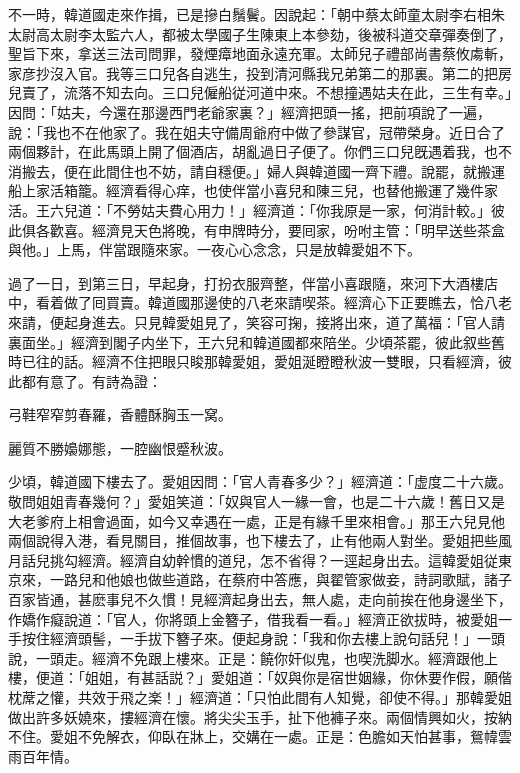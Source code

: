 不一時，韓道國走來作揖，已是摻白鬚鬢。因說起：「朝中蔡太師童太尉李右相朱太尉高太尉李太監六人，都被太學國子生陳東上本參劾，後被科道交章彈奏倒了，聖旨下來，拿送三法司問罪，發煙瘴地面永遠充軍。太師兒子禮部尚書蔡攸䖏斬，家彦抄沒入官。我等三口兒各自逃生，投到清河縣我兄弟第二的那裏。第二的把房兒賣了，流落不知去向。三口兒僱船従河道中來。不想撞遇姑夫在此，三生有幸。」因問：「姑夫，今還在那邊西門老爺家裏？」經濟把頭一搖，把前項說了一遍，說：「我也不在他家了。我在姐夫守備周爺府中做了參謀官，冠帶榮身。近日合了兩個夥計，在此馬頭上開了個酒店，胡亂過日子便了。你們三口兒旣遇着我，也不消搬去，便在此間住也不妨，請自穩便。」婦人與韓道國一齊下禮。說罷，就搬運船上家活箱籠。經濟看得心痒，也使伴當小喜兒和陳三兒，也替他搬運了幾件家活。王六兒道：「不勞姑夫費心用力！」經濟道：「你我原是一家，何消計較。」彼此俱各歡喜。經濟見天色將晚，有申牌時分，要囘家，吩咐主管：「明早送些茶盒與他。」上馬，伴當跟隨來家。一夜心心念念，只是放韓愛姐不下。

過了一日，到第三日，早起身，打扮衣服齊整，伴當小喜跟隨，來河下大酒樓店中，看着做了囘買賣。韓道國那邊使的八老來請喫茶。經濟心下正要瞧去，恰八老來請，便起身進去。只見韓愛姐見了，笑容可掬，接將出來，道了萬福：「官人請裏面坐。」經濟到閣子内坐下，王六兒和韓道國都來陪坐。少頃茶罷，彼此叙些舊時已往的話。經濟不住把眼只睃那韓愛姐，愛姐涎瞪瞪秋波一雙眼，只看經濟，彼此都有意了。有詩為證：

\begin{myquote}
弓鞋窄窄剪春羅，香體酥胸玉一窝。

麗質不勝嬝娜態，一腔幽恨蹙秋波。
\end{myquote}

少頃，韓道國下樓去了。愛姐因問：「官人青春多少？」經濟道：「虚度二十六歲。敬問姐姐青春幾何？」愛姐笑道：「奴與官人一緣一會，也是二十六歲！舊日又是大老爹府上相會過面，如今又幸遇在一處，正是有緣千里來相會。」那王六兒見他兩個說得入港，看見關目，推個故事，也下樓去了，止有他兩人對坐。愛姐把些風月話兒挑勾經濟。經濟自幼幹慣的道兒，怎不省得？一逕起身出去。這韓愛姐従東京來，一路兒和他娘也做些道路，在蔡府中答應，與翟管家做妾，詩詞歌賦，諸子百家皆通，甚麽事兒不久慣！見經濟起身出去，無人處，走向前挨在他身邊坐下，作嬌作癡說道：「官人，你將頭上金簪子，借我看一看。」經濟正欲拔時，被愛姐一手按住經濟頭髻，一手拔下簪子來。便起身說：「我和你去樓上說句話兒！」一頭說，一頭走。經濟不免跟上樓來。正是：饒你奸似鬼，也喫洗脚水。經濟跟他上樓，便道：「姐姐，有甚話説？」愛姐道：「奴與你是宿世姻緣，你休要作假，願偕枕蓆之懽，共效于飛之楽！」經濟道：「只怕此間有人知覺，卻使不得。」那韓愛姐做出許多妖嬈來，摟經濟在懷。將尖尖玉手，扯下他褲子來。兩個情興如火，按納不住。愛姐不免解衣，仰臥在牀上，交媾在一處。正是：色膽如天怕甚事，鴛幃雲雨百年情。

